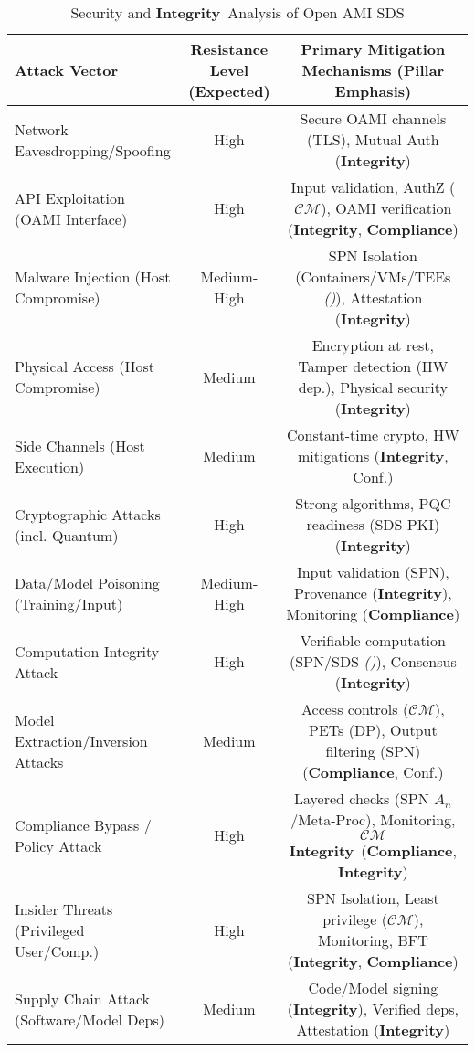 \documentclass[12pt,a4paper]{report}
\renewcommand{\citep}[1]{\textit{\scriptsize{(\cite{#1})}}}
\newcommand{\Integrity}{\textbf{Integrity}}
\begin{document}
	\begin{table}[ht]
		\centering
		\caption[Security and Integrity Analysis of Open AMI SDS]{Security and \Integrity\ Analysis of Open AMI SDS}
		\label{tab:security-analysis}
		\begin{tabular}{@{}lcc@{}}
			\toprule
			\textbf{Attack Vector} & \textbf{Resistance Level (Expected)} & \textbf{Primary Mitigation Mechanisms (Pillar Emphasis)} \\
			\midrule
			Network Eavesdropping/Spoofing & High & Secure OAMI channels (TLS), Mutual Auth (\Integrity) \\
			API Exploitation (OAMI Interface) & High & Input validation, AuthZ ($\mathcal{CM}$), OAMI verification (\Integrity, \textbf{Compliance}) \\
			Malware Injection (Host Compromise) & Medium-High & SPN Isolation (Containers/VMs/TEEs \citep{Citadel_PlusPlus_2025}), Attestation (\Integrity) \\
			Physical Access (Host Compromise) & Medium & Encryption at rest, Tamper detection (HW dep.), Physical security (\Integrity) \\
			Side Channels (Host Execution) & Medium & Constant-time crypto, HW mitigations (\Integrity, Conf.) \\
			Cryptographic Attacks (incl. Quantum) & High & Strong algorithms, PQC readiness (SDS PKI) (\Integrity) \\
			Data/Model Poisoning (Training/Input) & Medium-High & Input validation (SPN), Provenance (\Integrity), Monitoring (\textbf{Compliance}) \\
			Computation Integrity Attack & High & Verifiable computation (SPN/SDS \citep{Peng2025ZKMLSurvey}), Consensus (\Integrity) \\
			Model Extraction/Inversion Attacks & Medium & Access controls ($\mathcal{CM}$), PETs (DP), Output filtering (SPN) (\textbf{Compliance}, Conf.) \\
			Compliance Bypass / Policy Attack & High & Layered checks (SPN $A_n$/Meta-Proc), Monitoring, $\mathcal{CM}$ \Integrity\ (\textbf{Compliance}, \Integrity) \\
			Insider Threats (Privileged User/Comp.) & High & SPN Isolation, Least privilege ($\mathcal{CM}$), Monitoring, BFT (\Integrity, \textbf{Compliance}) \\
			Supply Chain Attack (Software/Model Deps) & Medium & Code/Model signing (\Integrity), Verified deps, Attestation (\Integrity) \\
			\bottomrule
		\end{tabular}
	\end{table}
	
\end{document}
